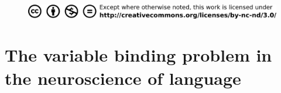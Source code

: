 \documentclass[twoside, justified, notoc, nobib, 
	nohyper]{tufte-book}
\begin{document}
\begin{fullwidth}
\begin{figure}[b]
\begin{center}
\includegraphics{figures/title/creativecommons}
\end{center}
\end{figure}


\end{fullwidth}%
\clearpage\null\newpage


%

%

%

%

\cleardoublepage

\begin{fullwidth}
\tableofcontents
\end{fullwidth}

\begin{fullwidth}
\listoffigures
\end{fullwidth}

\begin{fullwidth}
\listoftables
\end{fullwidth}

%
%
\clearpage\null\newpage

\setcounter{page}{1}
%
\cleardoublepage


\part{The variable binding problem in the neuroscience of language}
\cleardoublepage
%
\FloatBarrier
%
\FloatBarrier
%
\FloatBarrier
\end{document}
